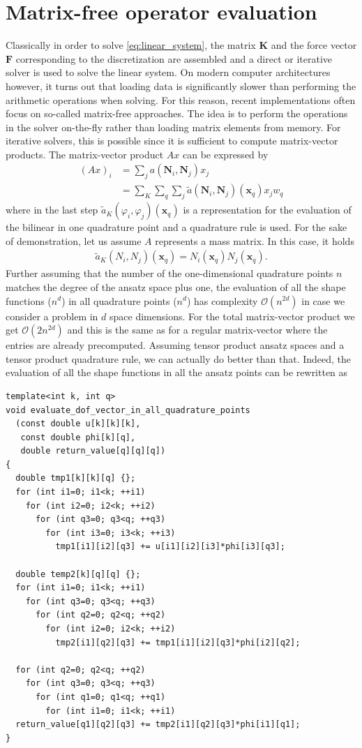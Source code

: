 \documentclass[preprint,12pt,times]{elsarticle}
\def\gz  #1{           \mbox{$\boldsymbol{#1}$}}
\begin{document}
\section{Matrix-free operator evaluation}
\label{sec:mf}
Classically in order to solve \eqref{eq:linear_system}, the matrix $\gz K$ and the force vector $\gz F$ corresponding to the discretization are assembled and
a direct or iterative solver is used to solve the linear system.
On modern computer architectures however, it turns out that loading data is significantly slower than performing the arithmetic operations when solving.
For this reason, recent implementations often focus on so-called matrix-free approaches. The idea is to perform the operations in the solver on-the-fly
rather than loading matrix elements from memory.
For iterative solvers, this is possible since it is sufficient to compute matrix-vector products.
%
The matrix-vector product $A x$ can be expressed by
\begin{align*}
 (Ax)_i &= \sum_j a(\gz N_i,\gz N_j) x_j \\
        &= \sum_K\sum_q \sum_j \tilde{a}(\gz N_i,\gz N_j)(\gz x_q) x_j w_q
\end{align*}
where in the last step $\tilde{a}_K(\varphi_i,\varphi_j)(\gz x_q)$ is a representation for the evaluation of the bilinear in one quadrature point and a quadrature rule is used.
For the sake of demonstration, let us assume $A$ represents a mass matrix. In this case, it holds
\begin{align*}
 \tilde{a}_K(N_i,N_j)(\gz x_q) = N_i(\gz x_q)N_j(\gz x_q).
\end{align*}
Further assuming that the number of the one-dimensional quadrature points $n$ matches the degree of the ansatz space plus one, the evaluation of all the shape functions ($n^d$)
in all quadrature points ($n^d$) has complexity $\mathcal{O}(n^{2d})$ in case we consider a problem in $d$ space dimensions. For the total matrix-vector product we get $\mathcal{O}(2n^{2d})$
and this is the same as for a regular matrix-vector where the entries are already precomputed. Assuming tensor product ansatz spaces and a tensor product quadrature rule, we can actually do better
than that. Indeed, the evaluation of all the shape functions in all the ansatz points can be rewritten as
\begin{lstlisting}
template<int k, int q>
void evaluate_dof_vector_in_all_quadrature_points
  (const double u[k][k][k],
   const double phi[k][q],
   double return_value[q][q][q])
{
  double tmp1[k][k][q] {};
  for (int i1=0; i1<k; ++i1)
    for (int i2=0; i2<k; ++i2)
      for (int q3=0; q3<q; ++q3)
        for (int i3=0; i3<k; ++i3)
          tmp1[i1][i2][q3] += u[i1][i2][i3]*phi[i3][q3];

  double temp2[k][q][q] {};
  for (int i1=0; i1<k; ++i1)
    for (int q3=0; q3<q; ++q3)
      for (int q2=0; q2<q; ++q2)
        for (int i2=0; i2<k; ++i2)
          tmp2[i1][q2][q3] += tmp1[i1][i2][q3]*phi[i2][q2];

  for (int q2=0; q2<q; ++q2)
    for (int q3=0; q3<q; ++q3)
      for (int q1=0; q1<q; ++q1)
        for (int i1=0; i1<k; ++i1)
  return_value[q1][q2][q3] += tmp2[i1][q2][q3]*phi[i1][q1];
}
\end{lstlisting}
\end{document}
